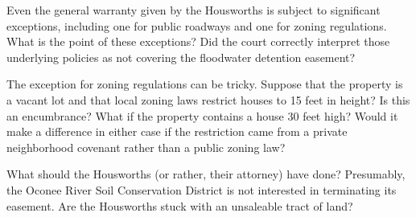 
\item Even the general warranty given by the Housworths is subject to
significant exceptions, including one for public roadways and one for zoning
regulations. What is the point of these exceptions? Did the court correctly
interpret those underlying policies as not covering the floodwater detention
easement?


\item The exception for zoning regulations can be tricky. Suppose that the
property is a vacant lot and that local zoning laws restrict houses to 15 feet
in height? Is this an encumbrance? What if the property contains a house 30
feet high? Would it make a difference in either case if the restriction came
from a private neighborhood covenant rather than a public zoning law?


\item What should the Housworths (or rather, their attorney) have done?
Presumably, the Oconee River Soil Conservation District is not interested in
terminating its easement. Are the Housworths stuck with an unsaleable tract of
land?

